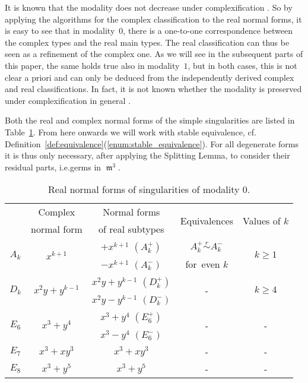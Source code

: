 \documentclass[noend]{amsproc}
\theoremstyle{definition}
\newcommand{\requiv}{\ensuremath{\mathrel{\overset{r}{\sim}}}}
\DeclareMathOperator{\m}{\mathfrak{m}}
\begin{document}
It is known that the modality does not decrease under complexification
\citep[pp.~273-274]{AVG1985}. So by applying the algorithms for the complex
classification to the real normal forms, it is easy to see that in
modality~$0$, there is a one-to-one correspondence between the complex types
and the real main types. The real classification can thus be seen as a
refinement of the complex one. As we will see in the subsequent parts of this
paper, the same holds true also in modality~$1$, but in both cases, this is not
clear a priori and can only be deduced from the independently derived complex
and real classifications. In fact, it is not known whether the modality is
preserved under complexification in general \citep[pp.~273-274]{AVG1985}.

Both the real and complex normal forms of the simple singularities are listed
in Table~\ref{tab:normal_forms}. From here onwards we will work with stable
equivalence, cf.\@
Definition~\ref{def:equivalence}(\ref{enum:stable_equivalence}). For all
degenerate forms it is thus only necessary, after applying the Splitting Lemma,
to consider their residual parts, i.e.\@ germs in $\m^3$.

\begin{table}[!htb]
\centering
\caption{Real normal forms of singularities of modality $0$.}
\label{tab:normal_forms}
\begin{tabular}{|c|c|c|c|c|}
\hline
& Complex & Normal forms & \multirow{2}{*}{Equivalences} &
\multirow{2}{*}{Values of $k$} \\
& normal form & of real subtypes & & \\
\hline
\multirow{2}{*}{$A_k$} & \multirow{2}{*}{$x^{k+1}$} & $+x^{k+1}$ $(A_k^+)$ &
$A_k^+ \requiv A_k^-$ & \multirow{2}{*}{$k \geq 1$} \\ \cline{3-3}
& & $-x^{k+1}$ $(A_k^-)$ & for~even $k$ & \\
\hline
\multirow{2}{*}{$D_k$} & \multirow{2}{*}{$x^2y+y^{k-1}$} &
$x^2y+y^{k-1}$ $(D_k^+)$ & \multirow{2}{*}{-} &
\multirow{2}{*}{$k \geq 4$} \\ \cline{3-3}
& & $x^2y-y^{k-1}$ $(D_k^-)$ & & \\
\hline
\multirow{2}{*}{$E_6$} & \multirow{2}{*}{$x^3+y^4$} & $x^3+y^4$ $(E_6^+)$ &
\multirow{2}{*}{-} & \multirow{2}{*}{-} \\ \cline{3-3}
& & $x^3-y^4$ $(E_6^-)$ & & \\
\hline
$E_7$ & $x^3+xy^3$ & $x^3+xy^3$ & - & - \\
\hline
$E_8$ & $x^3+y^5$ & $x^3+y^5$ & - & - \\
\hline
\end{tabular}
\end{table}
\end{document}
